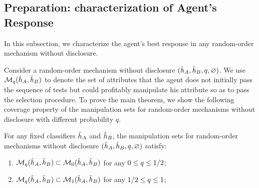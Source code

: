 \subsection{Preparation: characterization of Agent's Response}\label{sec: characterization BR}


In this subsection, we characterize the agent's best response in any random-order mechanism without disclosure.

Consider a random-order mechanism without disclosure $(\tilde {h}_A, \tilde {h}_B, q, \varnothing)$. 
We use $\mathcal{M}_{q}(\tilde{h}_A,\tilde{h}_B)$ to denote the set of attributes that the agent does not initially pass the sequence of tests but could profitably manipulate his attribute so as to pass the selection procedure. 
To prove the main theorem, we show the following coverage property of the manipulation sets for random-order mechanisms without disclosure with different probability $q$. 
\begin{proposition}\label{prop: coverage of Mq}
     For any fixed classifiers $\tilde{h}_A$ and $\tilde{h}_B$, the manipulation sets for random-order mechanisms without disclosure $(\tilde{h}_A,\tilde{h}_B,q,\varnothing)$ satisfy:
    \begin{enumerate}
        \item $\mathcal{M}_{q}(\tilde {h}_A, \tilde {h}_B) \subset \mathcal{M}_{0} (\tilde {h}_A, \tilde {h}_B)$ for any $0\leq q \leq 1/2$;
        \item $\mathcal{M}_{q} (\tilde {h}_A, \tilde {h}_B) \subset \mathcal{M}_{1} (\tilde {h}_A, \tilde {h}_B)$ for any $1/2 \leq q \leq  1$;
    \end{enumerate}  
\end{proposition}



